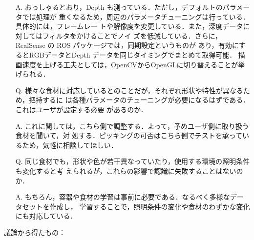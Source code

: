 \documentclass{jsarticle}
\begin{document}
\begin{itemize}
  \item [A.]おっしゃるとおり，Depth も測っている．ただし，デフォルトのパラメータでは処理が
  \hspace*{5.5zw}重くなるため，周辺のパラメータチューニングは行っている．具体的には，フレームレー
  \hspace*{5.5zw}トや解像度を変更している．また，深度データに対してはフィルタをかけることでノイ
  \hspace*{5.5zw}ズを低減している．さらに，RealSense の ROS パッケージでは，同期設定というものが
  \hspace*{5.5zw}あり，有効にするとRGBデータとDepth データを同じタイミングでまとめて取得可能．
  \hspace*{5.5zw}描画速度を上げる工夫としては，OpenCVからOpenGLに切り替えることが挙げられる．\\
  \vspace*{1zh}


  \item [Q.]様々な食材に対応しているとのことだが，それぞれ形状や特性が異なるため，把持するに
  \hspace*{5.5zw}は各種パラメータのチューニングが必要になるはずである．これはユーザが設定する必要
  \hspace*{5.5zw}があるのか．
  \vspace*{1zh}

  \item [A.]これに関しては，こちら側で調整する．よって，予めユーザ側に取り扱う食材を聞いて，対
  \hspace*{5.5zw}処する．ピッキングの可否はこちら側でテストを承っているため，気軽に相談してほしい．\\

  \vspace*{1zh}


  \item [Q.]同じ食材でも，形状や色が若干異なっていたり，使用する環境の照明条件も変化すると考
  \hspace*{5.5zw}えられるが，これらの影響で認識に失敗することはないのか．
  \vspace*{1zh}

  \item [A.]もちろん，容器や食材の学習は事前に必要である．なるべく多様なデータセットを作成し，
  \hspace*{5.5zw}学習することで，照明条件の変化や食材のわずかな変化にも対応している．\\
\end{itemize}

\hspace*{4.7zw}議論から得たもの：
\end{document}
